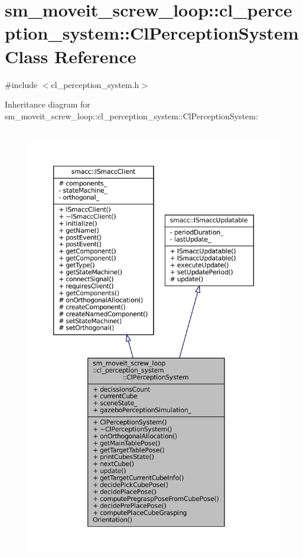\hypertarget{classsm__moveit__screw__loop_1_1cl__perception__system_1_1ClPerceptionSystem}{}\section{sm\+\_\+moveit\+\_\+screw\+\_\+loop\+:\+:cl\+\_\+perception\+\_\+system\+:\+:Cl\+Perception\+System Class Reference}
\label{classsm__moveit__screw__loop_1_1cl__perception__system_1_1ClPerceptionSystem}


{\ttfamily \#include $<$cl\+\_\+perception\+\_\+system.\+h$>$}



Inheritance diagram for sm\+\_\+moveit\+\_\+screw\+\_\+loop\+:\+:cl\+\_\+perception\+\_\+system\+:\+:Cl\+Perception\+System\+:
\nopagebreak
\begin{figure}[H]
\begin{center}
\leavevmode
\includegraphics[height=550pt]{classsm__moveit__screw__loop_1_1cl__perception__system_1_1ClPerceptionSystem__inherit__graph}
\end{center}
\end{figure}


